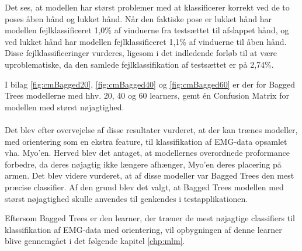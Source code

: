 Det ses, at modellen har størst problemer med at klassificerer korrekt ved de to poses åben hånd og lukket hånd. Når den faktiske pose er lukket hånd har modellen fejlklassificeret 1,0\% af vinduerne fra testsættet til afslappet hånd, og ved lukket hånd har modellen fejlklassificeret 1,1\% af vinduerne til åben hånd. 
Disse fejlklassificeringer vurderes, ligesom i det indledende forløb til at være uproblematiske, da den samlede fejlklassifikation af testsættet er på 2,74\%. 

I bilag \ref{fig:cmBagged20}, \ref{fig:cmBagged40} og \ref{fig:cmBagged60} er der for Bagged Trees modellerne med hhv. 20, 40 og 60 learners, gemt én Confusion Matrix for modellen med størst nøjagtighed.\\\\
Det blev efter overvejelse af disse resultater vurderet, at der kan trænes modeller, med orientering som en ekstra feature, til klassifikation af EMG-data opsamlet vha. Myo'en. Herved blev det antaget, at modellernes overordnede proformance forbedre, da deres nøjagtig ikke længere afhænger, Myo'en deres placering på armen. Det blev videre vurderet, at af disse modeller var Bagged Trees den mest præcise classifier. Af den grund blev det valgt, at Bagged Trees modellen med størst nøjagtighed skulle anvendes til genkendes i testapplikationen. 

Eftersom Bagged Trees er den learner, der træner de mest nøjagtige classifiers til klassifikation af EMG-data med orientering, vil opbygningen af denne learner blive gennemgået i det følgende kapitel \ref{chp:mlm}.
 